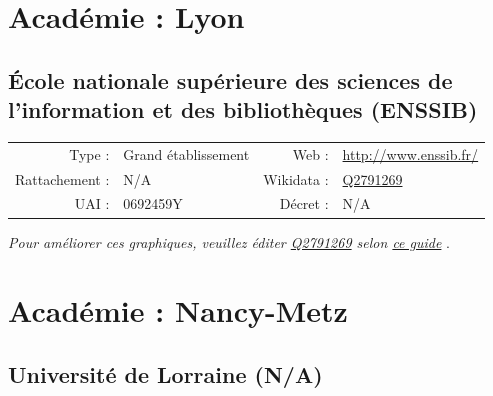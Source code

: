 \documentclass[11pt,french,landscape]{article}
\begin{document}

\newpage

\hypertarget{acaduxe9mie-lyon-1}{%
\section{Académie : Lyon}\label{acaduxe9mie-lyon-1}}

\hypertarget{uxe9cole-nationale-supuxe9rieure-des-sciences-de-linformation-et-des-bibliothuxe8ques-enssib}{%
\subsection{École nationale supérieure des sciences de l'information et
des bibliothèques
(ENSSIB)}\label{uxe9cole-nationale-supuxe9rieure-des-sciences-de-linformation-et-des-bibliothuxe8ques-enssib}}

\begin{tabular*}{0.45\textwidth}{rp{2cm}rl}  
\hline  
Type : & Grand établissement & Web : &\href{http://www.enssib.fr/}{http://www.enssib.fr/} \\  
Rattachement : & N/A & Wikidata : & \href{https://www.wikidata.org/entity/Q2791269}{Q2791269} \\  
UAI : & 0692459Y & Décret : & N/A \\  
\hline  
\end{tabular*}

\textit{\scriptsize Pour améliorer ces graphiques, veuillez éditer \href{https://www.wikidata.org/entity/Q2791269}{Q2791269}  selon \href{https://github.com/cpesr/wikidataESR/blob/master/Rmd/wikidataESR.md}{ce guide}}
.


\newpage

\hypertarget{acaduxe9mie-nancy-metz}{%
\section{Académie : Nancy-Metz}\label{acaduxe9mie-nancy-metz}}

\hypertarget{universituxe9-de-lorraine-na}{%
\subsection{Université de Lorraine
(N/A)}\label{universituxe9-de-lorraine-na}}
\end{document}
